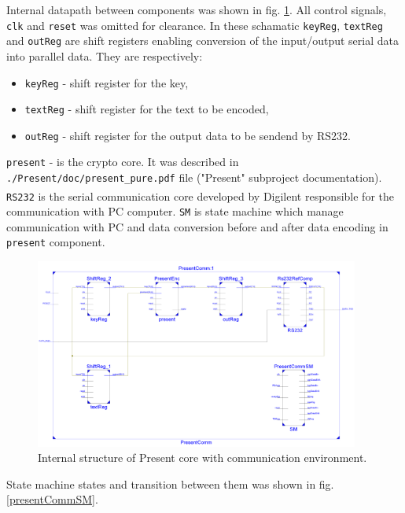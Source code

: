 \documentclass{gajewski}
\begin{document}
Internal datapath between components was shown in fig. \ref{pinside}. All control signals, \texttt{clk} and \texttt{reset} was omitted for clearance. In these schamatic \texttt{keyReg}, \texttt{textReg} and \texttt{outReg} are shift registers enabling conversion of the input/output serial data into parallel data. They are respectively:
\begin{itemize}
    \item \texttt{keyReg} - shift register for the key,
    \item \texttt{textReg} - shift register for the text to be encoded,
    \item \texttt{outReg} - shift register for the output data to be sendend by RS232.
\end{itemize}
\texttt{present} - is the crypto core. It was described in \texttt{./Present/doc/present\_pure.pdf} file ("Present" subproject documentation). \texttt{RS232} is the serial communication core developed by Digilent\textsuperscript{\textregistered} responsible for the communication with PC computer.
\texttt{SM} is state machine which manage communication with PC and data conversion before and after data encoding in \texttt{present} component.

\begin{figure}[!ht]%
    \begin{center}
    \includegraphics[width=0.95\textwidth]{img/PresentCommInside.png}
    \caption{%
        Internal structure of Present core with communication environment. 
     }%
    \label{pinside}
    \end{center}
 \end{figure}

State machine states and transition between them was shown in fig. \ref{presentCommSM}.
\end{document}
